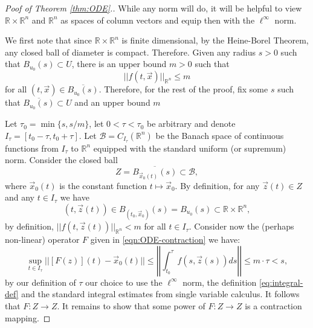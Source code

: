 \documentclass[10pt]{article}
\theoremstyle{definition}
\theoremstyle{remark}
\newcommand{\bbR}{\mathbb{R}}
\begin{document}
\begin{proof}[Poof of Theorem \ref{thm:ODE}.]
  While any norm will do, it will be helpful to view $\bbR \times \bbR^{n}$ and $\bbR^n$ as spaces of column vectors and equip then with the $\ell^\infty$ norm.

We first note that since $\bbR \times \bbR^n$ is finite dimensional, by the Heine-Borel Theorem, any closed ball of diameter is compact. Therefore. Given any radius $s>0$ such that $B_{u_0}(s)\subset U$, there is an upper bound $m>0$ such that\[ ||f(t,\vec x)||_{\bbR^n} \leq m \] for all $(t,\vec x) \in \overline{B_{u_0}(s)}$. Therefore, for the rest of the proof, fix some $s$ such that $\overline{B_{u_0}(s)} \subset U$ and an upper bound $m$


  Let $\tau_0 = \min\{s,s/m\}$, let $0 <\tau < \tau_0$ be arbitrary and denote $I_\tau = [t_0-\tau,t_0+\tau]$. Let $\mathcal B = C_{I_\tau}(\bbR^n)$ be the Banach space of continuous functions from $I_\tau$ to $\bbR^n$ equipped with the standard uniform (or supremum) norm. Consider the closed ball \[
    Z = \overline{B_{\vec x_0(t)}(s)} \subset  \mathcal B,
  \] where $\vec x_0(t)$ is the constant function $t \mapsto \vec x_0$. By definition, for any $\vec z(t) \in Z$ and any $t \in I_\tau$ we have \[(t,\vec z(t)) \in B_{(t_0,\vec x_0)}(s) = B_{u_0}(s)\subset \bbR\times\bbR^{n},\]
  by definition, $||f(t,\vec z(t))||_{\bbR^n}<m$ for all $t \in I_\tau$. Consider now the (perhaps non-linear) operator $F$ given in \eqref{eqn:ODE-contraction} we have:\[
    \sup_{t \in I_\tau}||[F(z)](t) - \vec x_0(t)|| \leq \left|\left|\int_{t_0}^\tau f(s,\vec z(s))ds\right|\right|%
    \leq m\cdot \tau < s,
  \] by our definition of $\tau$ our choice to use the $\ell^\infty$ norm, the definition \eqref{eq:integral-def} and the standard integral estimates from single variable calculus. It follows that $F:Z \to Z$. It remains to show that some power of $F:Z \to Z$ is a contraction mapping.


\end{proof}
\end{document}
